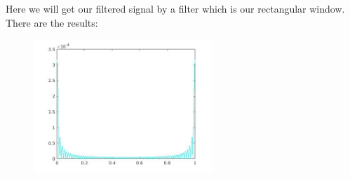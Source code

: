 \documentclass[a4paper,11pt]{article}
\begin{document}
Here we will get our filtered signal by a filter which is our rectangular window. There are the results:

\begin{figure}[!hp]
    \begin{center}
      \includegraphics[width=0.6\textwidth]{images/lab2_19.jpg}
    \end{center}
\end{figure}

\newpage
\end{document}
